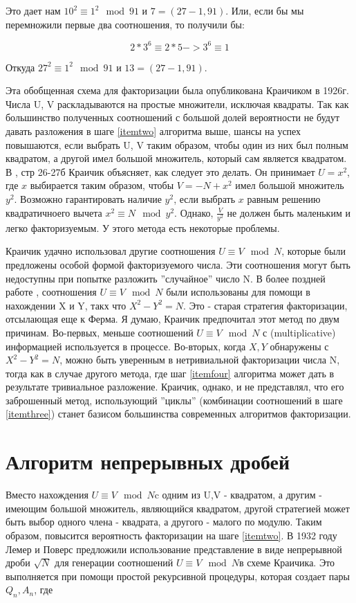 \documentclass[a4paper,12pt]{report}
\newcommand{\sus }{$U \equiv V \mod N$}
\begin{document}
Это дает нам $10^2 \equiv 1^2 \mod 91$ и $7 = (27-1, 91)$. Или, если бы мы перемножили первые два соотношения, то получили бы:

\begin{equation*}
2*3^6 \equiv 2*5 -> 3^6 \equiv 1
\end{equation*}


Откуда $27^2 \equiv 1^2 \mod 91$ и $13 = (27-1, 91)$.

Эта обобщенная схема для факторизации была опубликована Краичиком \cite{krai} в 1926г. Числа U, V раскладываются на простые множители, исключая квадраты. Так как большинство полученных соотношений с большой долей вероятности не будут давать разложения в шаге \ref{itemtwo} алгоритма выше, шансы на успех повышаются, если выбрать U, V таким образом, чтобы один из них был полным квадратом, а другой имел большой множитель, который сам является квадратом. В \cite{krai}, стр 26-27б Краичик объясняет, как следует это делать. Он принимает $U = x^2$, где $x$ выбирается таким образом, чтобы $V = -N+x^2$ имел большой множитель $y^2$. Возможно гарантировать наличие $y^2$, если выбрать $x$ равным решению квадратичноего вычета $x^2 \equiv N \mod y^2$. Однако, $\frac{V}{y^2}$ не должен быть маленьким и легко факторизуемым. У этого метода есть некоторые проблемы.

Краичик удачно использовал другие соотношения $U \equiv V \mod N$, которые были предложены особой формой факторизуемого числа. Эти соотношения могут быть недоступны при попытке разложить  ''случайное'' число N. В более поздней работе \cite{krai2}, соотношения $U \equiv V \mod N$ были использованы для помощи в нахождении X и Y, такх что $X^2 - Y^2 = N$. Это - старая стратегия факторизации, отсылающая еще к Ферма. Я думаю, Краичик предпочитал этот метод по двум причинам. Во-первых, меньше соотношений $U \equiv V \mod N$ с (multiplicative) информацией используется в процессе. Во-вторых, когда $X, Y$ обнаружены с $X^2 - Y^2 = N$, можно быть уверенным в нетривиальной факторизации числа N, тогда как в случае другого метода, где шаг \ref{itemfour} алгоритма может дать в результате тривиальное разложение. Краичик, однако, и не представлял, что его заброшенный метод, использующий ''циклы'' (комбинации соотношений в шаге \ref{itemthree}) станет базисом большинства современных алгоритмов факторизации. 
\section{Алгоритм непрерывных дробей}
Вместо нахождения \sus   c одним из U,V - квадратом, а другим - имеющим большой множитель, являющийся квадратом, другой стратегией может быть выбор одного члена - квадрата, а другого - малого по модулю. Таким образом, повысится вероятность факторизации на шаге \ref{itemtwo}. В 1932 году Лемер и Поверс \cite{bull} предложили использование представление в виде непрерывной дроби $\sqrt{N}$ для генерации соотношений \sus  в схеме Краичика. Это выполняется при помощи простой рекурсивной процедуры, которая создает пары $Q_{n}, A_{n}$, где
\end{document}
